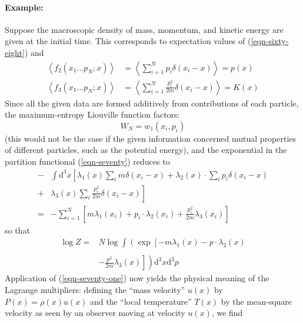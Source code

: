 \documentclass[]{article}
\begin{document}
\paragraph{Example:} Suppose the macroscopic density of mass, momentum, and kinetic energy are given at the initial time. This corresponds to expectation values of (\ref{eqn-sixty-eight}) and
\begin{align}
\left\langle f_{2}\left(x_{1} \ldots p_{N} ; x\right)\right\rangle & =\left\langle\sum_{i=1}^{N} p_{i} \delta\left(x_{i}-x\right)\right\rangle=p(x) \\
\left\langle f_{3}\left(x_{1} \ldots p_{N} ; x\right)\right\rangle & =\left\langle\sum_{i=1}^{N} \frac{p_{i}^{2}}{2 m} \delta\left(x_{i}-x\right)\right\rangle=K(x)
\end{align}
Since all the given data are formed additively from contributions of each particle, the maximum-entropy Liouville function factors:
\begin{equation}
W_{N}=w_{1}\left(x_{i}, p_{i}\right) \label{eqn-seventy-four}
\end{equation}
(this would not be the case if the given information concerned mutual properties of different particles, such as the potential energy), and the exponential in the partition functional (\ref{eqn-seventy}) reduces to
\begin{align*}
 -& \int\text{d}^{3} x \left[\lambda_{1}( x ) \sum_{ i } m \delta\left( x _{ i }- x \right)+\lambda_{2}( x ) \cdot \sum_{ i } p _{ i } \delta\left( x _{ i }- x \right)\right. \\
  +& \left. \lambda_{3}( x ) \sum_{ i } \frac{ p _{ i }^{2}}{2 m } \delta\left( x _{ i }- x \right)\right] \\
 =& -\sum_{ i =1}^{ N }\left[ m \lambda_{1}\left( x _{ i }\right)+ p _{ i } \cdot \lambda_{2}\left( x _{ i }\right)+\frac{ p _{ i }^{2}}{2 m } \lambda_{3}\left( x _{ i }\right)\right]
\end{align*}
so that
\begin{align}
\log Z=& N \log \int\left(\exp \left[-m \lambda_{1}(x)-p \cdot \lambda_{2}(x)\right.\right. \nonumber \\
\\
&\left.\left.-\frac{p^{2}}{2 m} \lambda_{3}(x)\right]\right)\text{d}^{3} x\text{d}^{3} p \nonumber
\end{align}
Application of (\ref{eqn-seventy-one}) now yields the physical meaning of the Lagrange multipliers: defining the ``mass velocity'' $u ( x )$ by $P ( x )=\rho( x ) u ( x )$
and the ``local temperature'' $T ( x )$ by the mean-square velocity as seen by an observer moving at velocity $u(x)$,  we find
\end{document}
